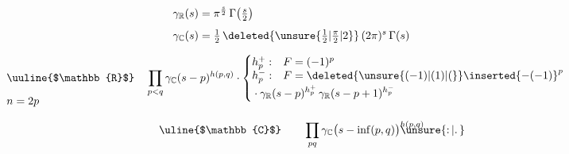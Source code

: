 \[
\begin{aligned}
\gamma_{\mathbb{R}}(s)&=\pi^{\frac{s}{2}}\,\Gamma\bigl(\tfrac{s}{2}\bigr)\\[4pt]
\gamma_{\mathbb{C}}(s)&=\tfrac{1}{2}\,\deleted{\unsure{\tfrac{1}{2}|\tfrac{\pi}{2}|2}}\,(2\pi)^{s}\,\Gamma(s)
\end{aligned}
\]

\[
\begin{aligned}
&\begin{aligned}[t]
&\text{\uuline{$\mathbb{R}$}}\\[6pt]
&n=2p
\end{aligned}
\quad
\prod_{p<q}\gamma_{\mathbb{C}}(s-p)^{h(p,q)}\cdot
\left\{\begin{array}{@{}l@{\quad}l@{}}
h_{p}^{+}: & F=(-1)^{p}\\
h_{p}^{-}: & F=\deleted{\unsure{(-1)|(1)|(}}\inserted{-(-1)}^{p}\\[2pt]
\multicolumn{2}{@{}l@{}}{\displaystyle {}\cdot\gamma_{\mathbb{R}}(s-p)^{h_{p}^{+}}\,\gamma_{\mathbb{R}}(s-p+1)^{h_{p}^{-}}}
\end{array}\right.
\end{aligned}
\]

\[
\text{\uline{$\mathbb{C}$}}\qquad
\prod_{pq}\gamma_{\mathbb{C}}\bigl(s-\inf(p,q){\bigr)\rlap{\(\unsure{\mathpunct{:}|\mathpunct{.}}\)}}^{h(p,q)}
\]
\clearpage
